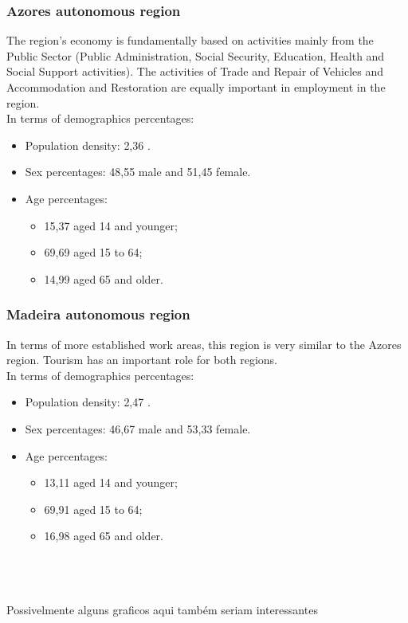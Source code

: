 \subsubsection{Azores autonomous region}
The region's economy is fundamentally based on activities mainly from the Public Sector (Public Administration, Social Security, Education, Health and Social Support activities). The activities of Trade and Repair of Vehicles and Accommodation and Restoration are equally important in employment in the region. \\
In terms of demographics percentages:
    \begin{itemize}
        \item Population density: {2,36\textdiscount} . 
        \item Sex percentages: {48,55\textdiscount} male and {51,45\textdiscount} female.
        \item Age percentages: 
        \begin{itemize}
        \item {15,37 \textdiscount} aged 14 and younger;
        \item {69,69\textdiscount} aged 15 to 64;
        \item {14,99\textdiscount} aged 65 and older.
        \end{itemize}
    \end{itemize}
    
\subsubsection{Madeira autonomous region }
In terms of more established work areas, this region is very similar to the Azores region. Tourism has an important role for both regions.\\
In terms of demographics percentages:
    \begin{itemize}
        \item Population density: {2,47\textdiscount} . 
        \item Sex percentages: {46,67\textdiscount} male and {53,33\textdiscount} female.
        \item Age percentages: 
        \begin{itemize}
        \item {13,11 \textdiscount} aged 14 and younger;
        \item {69,91\textdiscount} aged 15 to 64;
        \item {16,98\textdiscount} aged 65 and older.
        \end{itemize}
    \end{itemize}

\\
\\
\\
Possivelmente alguns graficos aqui também seriam interessantes \\ 

